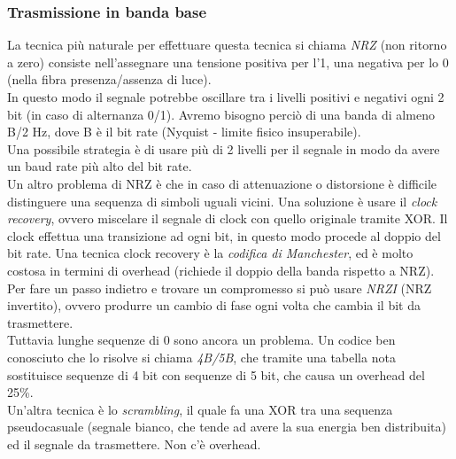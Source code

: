 \documentclass[10pt,a4paper,twoside]{article}
\begin{document}
\subsubsection{Trasmissione in banda base}
La tecnica più naturale per effettuare questa tecnica si chiama \textit{NRZ} (non ritorno a zero) consiste nell'assegnare una tensione positiva per l'1, una negativa per lo 0 (nella fibra presenza/assenza di luce).\\
In questo modo il segnale potrebbe oscillare tra i livelli positivi e negativi ogni 2 bit (in caso di alternanza 0/1). Avremo bisogno perciò di una banda di almeno B/2 Hz, dove B è il bit rate (Nyquist - limite fisico insuperabile).\\
Una possibile strategia è di usare più di 2 livelli per il segnale in modo da avere un baud rate più alto del bit rate.\\
Un altro problema di NRZ è che in caso di attenuazione o distorsione è difficile distinguere una sequenza di simboli uguali vicini. Una soluzione è usare il \textit{clock recovery}, ovvero miscelare il segnale di clock con quello originale tramite XOR. Il clock effettua una transizione ad ogni bit, in questo modo procede al doppio del bit rate. Una tecnica clock recovery è la \textit{codifica di Manchester}, ed è molto costosa in termini di overhead (richiede il doppio della banda rispetto a NRZ).\\
Per fare un passo indietro e trovare un compromesso si può usare \textit{NRZI} (NRZ invertito), ovvero produrre un cambio di fase ogni volta che cambia il bit da trasmettere.\\
Tuttavia lunghe sequenze di 0 sono ancora un problema. Un codice ben conosciuto che lo risolve si chiama \textit{4B/5B}, che tramite una tabella nota sostituisce sequenze di 4 bit con sequenze di 5 bit, che causa un overhead del 25\%.\\
Un'altra tecnica è lo \textit{scrambling}, il quale fa una XOR tra una sequenza pseudocasuale (segnale bianco, che tende ad avere la sua energia ben distribuita) ed il segnale da trasmettere. Non c'è overhead.
\end{document}
